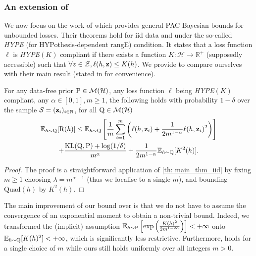 \begin{noaddcontents}
\subsubsection{An extension of \citet{haddouche2021pac}}

We now focus on the work of \citet{haddouche2021pac} which provides general PAC-Bayesian bounds for unbounded losses. Their theorems hold for iid data and under the so-called \emph{HYPE} (for HYPothesis-dependent rangE) condition. It states that a loss function $\ell$ is \emph{HYPE}$(K)$ compliant if there exists a function $K:\mathcal{H} \rightarrow \mathbb{R}^+ $ (supposedly accessible)  such that $\forall z\in\mathcal{Z}, \ell(h,\z) \leq K(h)$.
We provide  to compare ourselves with their main result (stated in   for convenience).
\begin{corollary}
\label{cor: haddouche_comparison}
For any data-free prior $\P\in \mathcal{M}(\mathcal{H})$, any loss function $\ell$ being \emph{HYPE}$(K)$ compliant, any $\alpha\in[0,1],m\geq 1$, the following holds with probability $1-\delta$ over the sample $\S=(\z_i)_{i\in\mathbb{N}}$, for all $\Q\in\mathcal{M}(\mathcal{H})$
\begin{multline*}
\mathbb{E}_{h\sim \Q} [\Risk(h)] \leq   \mathbb{E}_{h\sim \Q} \left[\frac{1}{m}\sum_{i=1}^m\left(\ell(h,\z_i) + \frac{1}{2m^{1-\alpha}} \ell(h,\z_i)^2\right)\right] \\
+ \frac{\operatorname{KL}(\Q,\P) +\log(1/\delta)}{m^{\alpha}}  + \frac{1}{2m^{1-\alpha}}\mathbb{E}_{h\sim \Q} [K^2(h)].
\end{multline*}
\end{corollary}

\begin{proof}
The proof is a straightforward application of \cref{th: main_thm_iid} by fixing $m\geq 1$ choosing $\lambda= m^{\alpha-1}$ (thus we localise  to a single $m$),  and bounding $\mathrm{Quad}(h)$ by $K^2(h)$.
\end{proof}
The main improvement of our bound over  is that we do not have to assume the convergence of an exponential moment to obtain a non-trivial bound. Indeed, we transformed the (implicit) assumption $\mathbb{E}_{h\sim \P} \left[\exp\left( \frac{K(h)^2}{2m^{1-2\alpha}} \right) \right] < +\infty $ onto $\mathbb{E}_{h\sim \Q}[K(h)^2] < +\infty$, which is significantly less restrictive.
Furthermore,  holds for a single choice of $m$ while ours still holds uniformly over all integers $m>0$.


\end{noaddcontents}
